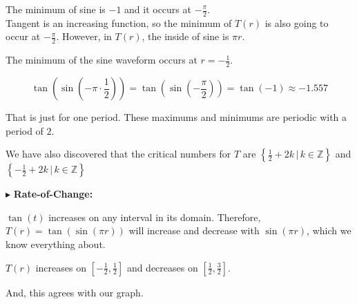 \documentclass{ximera}
\begin{document}
The minimum of sine is $-1$ and it occurs at $-\frac{\pi}{2}$.\\

Tangent is an increasing function, so the minimum of $T(r)$ is also going to occur at $-\frac{\pi}{2}$. However, in $T(r)$, the inside of sine is $\pi r$.


The minimum of the sine waveform occurs at $r = -\frac{1}{2}$.


\[   \tan\left(\sin\left(-\pi \cdot \frac{1}{2}\right)\right)  =   \tan\left(\sin\left(-\frac{\pi}{2}\right)\right)  = \tan(-1)  \approx -1.557  \]




That is just for one period. These maximums and minimums are periodic with a period of $2$.







We have also discovered that the critical numbers for $T$ are $\left\{ \frac{1}{2} + 2k \, | \, k \in \mathbb{Z} \right\}$ and $\left\{ -\frac{1}{2} + 2k \, | \, k \in \mathbb{Z} \right\}$










$\blacktriangleright$ \textbf{\textcolor{blue!55!black}{Rate-of-Change: }} 


$\tan(t)$ increases on any interval in its domain.  Therefore, $T(r) = \tan(\sin(\pi r))$ will increase and decrease with $\sin(\pi r)$, which we know everything about.




$T(r)$ increases on $\left[ -\frac{1}{2}, \frac{1}{2} \right]$ and decreases on $\left[\frac{1}{2}, \frac{3}{2} \right]$.



And, this agrees with our graph.
\end{document}
